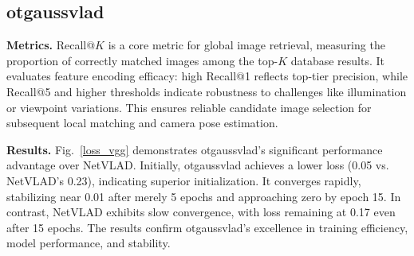 \documentclass[journal]{IEEEtran}
\begin{document}
\subsection{otgaussvlad}
\textbf{Metrics.} Recall@$K$ is a core metric for global image retrieval, measuring the proportion of correctly matched images among the top-$K$ database results. It evaluates feature encoding efficacy: high Recall@1 reflects top-tier precision, while Recall@5 and higher thresholds indicate robustness to challenges like illumination or viewpoint variations. This ensures reliable candidate image selection for subsequent local matching and camera pose estimation.

\textbf{Results.} Fig.~\ref{loss_vgg} demonstrates otgaussvlad's significant performance advantage over NetVLAD. Initially, otgaussvlad achieves a lower loss (0.05 vs. NetVLAD's 0.23), indicating superior initialization. It converges rapidly, stabilizing near 0.01 after merely 5 epochs and approaching zero by epoch 15. In contrast, NetVLAD exhibits slow convergence, with loss remaining at 0.17 even after 15 epochs. The results confirm otgaussvlad's excellence in training efficiency, model performance, and stability.
\end{document}
